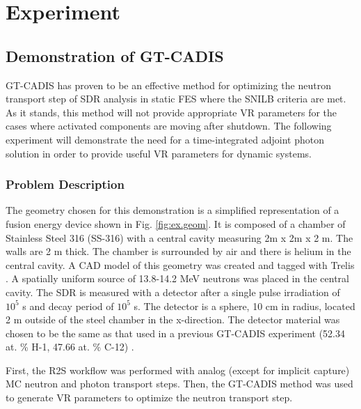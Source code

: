 \graphicspath{{/home/chelsea/prelim/src/figs}}

\chapter{Experiment} \label{ch:experiment}

\section{Demonstration of GT-CADIS} \label{sec:gtcadis}
GT-CADIS has proven to be an effective method 
for optimizing the neutron transport step of 
SDR analysis in static FES where the SNILB criteria are met.  As it stands, this method
will not provide appropriate VR parameters for the cases where activated
components are moving
after shutdown.  The following experiment will demonstrate the need for a
time-integrated adjoint photon solution in order to provide useful VR parameters for
dynamic systems.

\subsection{Problem Description} \label{sec:description}
The geometry chosen for this demonstration is a simplified representation of a 
fusion energy device shown in Fig. \ref{fig:ex.geom}.
It is composed of a chamber of Stainless Steel 316 (SS-316) with a central cavity measuring
2m x 2m x 2 m.  The walls are 2 m thick.  The chamber is surrounded by air and
there is helium in the central cavity.  A CAD model of this geometry was created and tagged
with Trelis \cite{trelis}.  A spatially uniform source of
13.8-14.2 MeV neutrons was placed in the central cavity. 
The SDR is measured with a detector after a single pulse irradiation of $10^5$ s and
decay period of $10^5$ s.  The detector is a sphere, 10 cm in radius, located
2 m outside of the steel chamber in the x-direction. The detector material was chosen to
be the same as that used in a previous GT-CADIS experiment (52.34 at. \% H-1,
47.66 at. \% C-12) \cite{gtcadis}.  

First, the R2S workflow was performed with analog (except for implicit capture)
MC neutron and photon transport steps.
Then, the GT-CADIS method was used to generate VR parameters
to optimize the neutron transport step.

